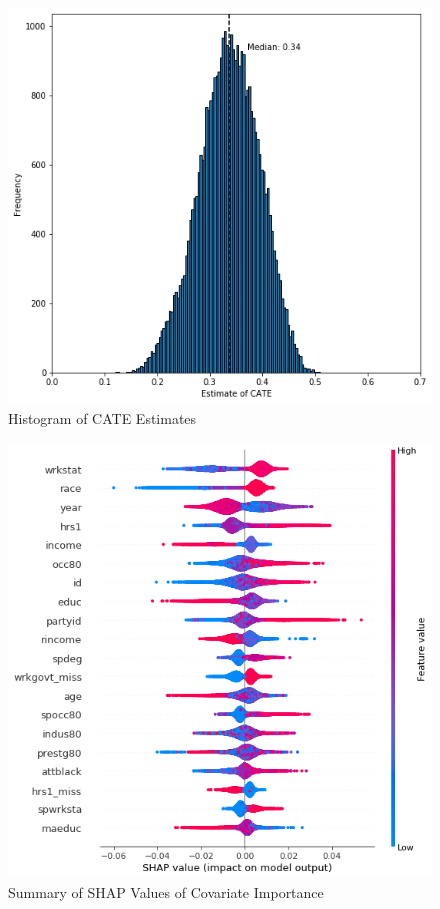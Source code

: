 \documentclass[12pt]{article}
\begin{document}
\begin{figure}[!htp]
\caption{Histogram of CATE Estimates}
	\centering
   	 	\includegraphics[width = 0.6\linewidth]{Graphs/s1_catefreq.png}
\end{figure} 

\begin{figure}[!htp]
\caption{Summary of SHAP Values of Covariate Importance}
	\centering
   	 	\includegraphics[width = 0.6\linewidth]{Graphs/s1_shap.png}
\end{figure} 
\end{document}
